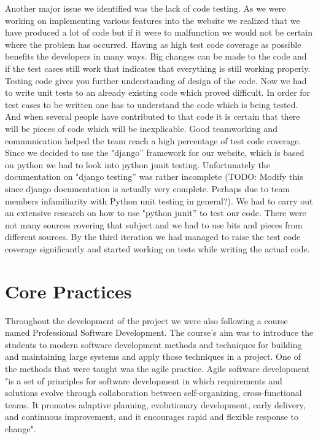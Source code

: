 \documentclass{l3proj}
\begin{document}
Another major issue we identified was the lack of code testing. As we were working on implementing various features into the website
we realized that we have produced a lot of code but if it were to malfunction we would not be certain where the problem has occurred.
Having as high test code coverage as possible benefits the developers in many ways. Big changes can be made to the code and if
the test cases still work that indicates that everything is still working properly. Testing code gives you further understanding of
design of the code. Now we had to write unit tests to an already existing code which proved difficult. In order for test cases to
be written one has to understand the code which is being tested. And when several people have contributed to that code it is certain
that there will be pieces of code which will be inexplicable. Good teamworking and communication helped the team reach a high percentage
of test code coverage. Since we decided to use the "django'' framework for our website, which is based on python we had to look into
python junit testing. Unfortunately the documentation on "django testing'' was rather incomplete (TODO: Modify this since django documentation
is actually very complete. Perhaps due to team members infamiliarity with Python unit testing in general?). We had to carry out an extensive research
on how to use "python junit'' to test our code. There were not many sources covering that subject and we had to use bits and pieces from
different sources. By the third iteration we had managed to raise the test code coverage significantly and started working on tests
while writing the actual code.

\section{Core Practices}
\label {Agile Software Development}

Throughout the development of the project we were also following a course named Professional Software Development.
The course's aim was to introduce the students to modern software development methods and techniques for building and
maintaining large systems and apply those techniques in a project. One of the methods that were taught
was the agile practice. Agile software development "is a set of principles for software development in
which requirements and solutions evolve through collaboration between self-organizing, cross-functional teams.
It promotes adaptive planning, evolutionary development, early delivery, and continuous improvement, and it encourages
rapid and flexible response to change".
\end{document}
